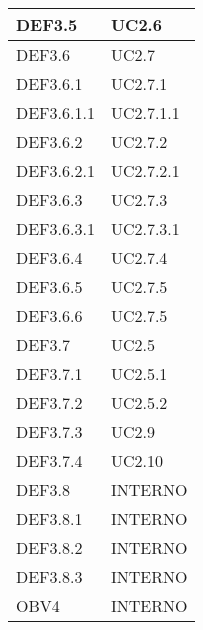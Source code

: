 \documentclass{scalatekids-article}
\begin{document}
\begin{longtable}[H]{|p{5.5cm}|p{5.5cm}|}
\hline
DEF3.5 & \multiLineCell[t]{UC2.6\\}\\
\hline
DEF3.6 & \multiLineCell[t]{UC2.7\\}\\
\hline
DEF3.6.1 & \multiLineCell[t]{UC2.7.1\\}\\
\hline
DEF3.6.1.1 & \multiLineCell[t]{UC2.7.1.1\\}\\
\hline
DEF3.6.2 & \multiLineCell[t]{UC2.7.2\\}\\
\hline
DEF3.6.2.1 & \multiLineCell[t]{UC2.7.2.1\\}\\
\hline
DEF3.6.3 & \multiLineCell[t]{UC2.7.3\\}\\
\hline
DEF3.6.3.1 & \multiLineCell[t]{UC2.7.3.1\\}\\
\hline
DEF3.6.4 & \multiLineCell[t]{UC2.7.4\\}\\
\hline
DEF3.6.5 & \multiLineCell[t]{UC2.7.5\\}\\
\hline
DEF3.6.6 & \multiLineCell[t]{UC2.7.5\\}\\
\hline
DEF3.7 & \multiLineCell[t]{UC2.5\\}\\
\hline
DEF3.7.1 & \multiLineCell[t]{UC2.5.1\\}\\
\hline
DEF3.7.2 & \multiLineCell[t]{UC2.5.2\\}\\
\hline
DEF3.7.3 & \multiLineCell[t]{UC2.9\\}\\
\hline
DEF3.7.4 & \multiLineCell[t]{UC2.10\\}\\
\hline
DEF3.8 & \multiLineCell[t]{INTERNO\\}\\
\hline
DEF3.8.1 & \multiLineCell[t]{INTERNO\\}\\
\hline
DEF3.8.2 & \multiLineCell[t]{INTERNO\\}\\
\hline
DEF3.8.3 & \multiLineCell[t]{INTERNO\\}\\
\hline
OBV4 & \multiLineCell[t]{INTERNO\\}\\

\end{longtable}
\end{document}
